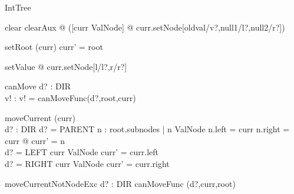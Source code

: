 \documentclass{article}
\begin{document}
\begin{class}{IntTree}
\classbreak
{}\classbreak
{}\classbreak
clear \sdef clearAux @ ([curr \in ValNode] @ curr.setNode[oldval/v?,null1/l?,null2/r?]) \\
\begin{op}{setRoot}
        \Delta (curr)
\where
	curr' = root
\end{op}\classbreak
setValue \sdef [ l, r : Node | curr \in ValNode \land l =
  curr.left \land r = curr.right ] @ curr.setNode[l/l?,r/r?]
\classbreak
{}\classbreak
\begin{op}{canMove}
	d? : DIR \\
        v! : \bool
\where
	v! = canMoveFunc(d?,root,curr)
\end{op}\classbreak
\begin{op}{moveCurrent}
        \Delta (curr) \\
        d? : DIR
\where
	d? = PARENT \implies
		\exists n : root.subnodes | n \in ValNode \implies  n.left = curr \lor n.right = curr
			@ curr' = n \\
	d? = LEFT \implies curr \in ValNode \land curr' = curr.left \\
	d? = RIGHT \implies curr \in ValNode \land curr' = curr.right
\end{op}\classbreak
\begin{op}{moveCurrentNotNodeExc}
        d? : DIR
\where
	\lnot canMoveFunc (d?,curr,root)
\end{op}
\end{class}
\end{document}
